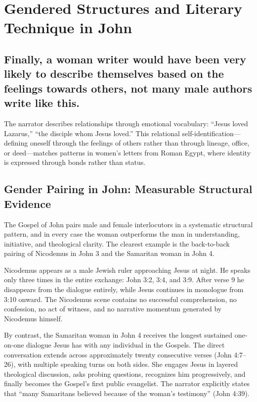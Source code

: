 \section{Gendered Structures and Literary Technique in John}\label{sec:gendered-structures-literary}

\subsection{Finally, a woman writer would have been very likely to describe themselves based on the feelings towards others, not many male authors write like this.}\label{subsec:finally-a-woman-writer-would-have-been-very-likely-to-describe-themselves-based-on-the-feelings-towards-others-not-many-male-authors-write-like-this.}

The narrator describes relationships through emotional vocabulary: ``Jesus loved Lazarus,'' ``the disciple whom Jesus loved.''
This relational self-identification---defining oneself through the feelings of others rather than through lineage, office, or deed---matches patterns in women's letters from Roman Egypt, where identity is expressed through bonds rather than status.

\subsection{Gender Pairing in John: Measurable Structural Evidence}\label{subsec:jesus-interactions-towards-nicodemus-are-also-very-feminine-close-and-personal-jesus-is-talking-about-being-born-again.}

The Gospel of John pairs male and female interlocutors in a systematic structural pattern, and in every case the woman outperforms the man in understanding, initiative, and theological clarity.
The clearest example is the back-to-back pairing of Nicodemus in John 3 and the Samaritan woman in John 4.

Nicodemus appears as a male Jewish ruler approaching Jesus at night.
He speaks only three times in the entire exchange: John 3:2, 3:4, and 3:9.
After verse 9 he disappears from the dialogue entirely, while Jesus continues in monologue from 3:10 onward.
The Nicodemus scene contains no successful comprehension, no confession, no act of witness, and no narrative momentum generated by Nicodemus himself.

By contrast, the Samaritan woman in John 4 receives the longest sustained one-on-one dialogue Jesus has with any individual in the Gospels.
The direct conversation extends across approximately twenty consecutive verses (John 4:7--26), with multiple speaking turns on both sides.
She engages Jesus in layered theological discussion, asks probing questions, recognizes him progressively, and finally becomes the Gospel's first public evangelist.
The narrator explicitly states that ``many Samaritans believed because of the woman's testimony'' (John 4:39).

